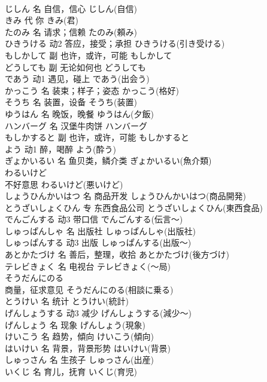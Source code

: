 \documentclass[8pt]{extreport}
\begin{document}
\begin{CJK}{UTF8}{min}
\\	じしん	名	自信，信心	じしん(自信)	
\\	きみ	代	你	きみ(君)	
\\	たのみ	名	请求；信赖	たのみ(頼み)	
\\	ひきうける	动2	答应，接受；承担	ひきうける(引き受ける)	
\\	もしかして	副	也许，或许，可能	もしかして	
\\	どうしても	副	无论如何也	どうしても	
\\	であう	动1	遇见，碰上	であう(出会う)	
\\	かっこう	名	装束；样子；姿态	かっこう(格好)	
\\	そうち	名	装置，设备	そうち(装置)	
\\	ゆうはん	名	晚饭，晚餐	ゆうはん(夕飯)	
\\	ハンバーグ	名	汉堡牛肉饼	ハンバーグ	
\\	もしかすると	副	也许，或许，可能	もしかすると	
\\	よう	动1	醉，喝醉	よう(酔う)	
\\	ぎょかいるい	名	鱼贝类，鳞介类	ぎょかいるい(魚介類)	
\\	わるいけど	
\\	不好意思	わるいけど(悪いけど)	
\\	しょうひんかいはつ	名	商品开发	しょうひんかいはつ(商品開発)	
\\	とうざいしょくひん	专	东西食品公司	とうざいしょくひん(東西食品)	
\\	でんごんする	动3	带口信	でんごんする(伝言～)	
\\	しゅっぱんしゃ	名	出版社	しゅっぱんしゃ(出版社)	
\\	しゅっぱんする	动3	出版	しゅっぱんする(出版～)	
\\	あとかたづけ	名	善后，整理，收拾	あとかたづけ(後方づけ)	
\\	テレビきょく	名	电视台	テレビきょく(～局)	
\\	そうだんにのる	
\\	商量，征求意见	そうだんにのる(相談に乗る)	
\\	とうけい	名	统计	とうけい(統計)	
\\	げんしょうする	动3	减少	げんしょうする(減少～)	
\\	げんしょう	名	现象	げんしょう(現象)	
\\	けいこう	名	趋势，傾向	けいこう(傾向)	
\\	はいけい	名	背景，背景形势	はいけい(背景)	
\\	しゅっさん	名	生孩子	しゅっさん(出産)	
\\	いくじ	名	育儿，抚育	いくじ(育児)	

\end{CJK}
\end{document}
